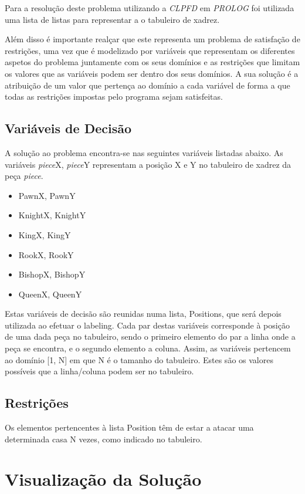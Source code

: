 \documentclass[runningheads]{llncs}
\begin{document}
Para a resolução deste problema utilizando a \emph{CLPFD} em \emph{PROLOG} foi utilizada uma lista de listas para representar a
o tabuleiro de xadrez.

Além disso é importante realçar que este representa um problema de satisfação de restrições, uma vez que é modelizado por variáveis que
representam os diferentes aspetos do problema juntamente com os seus domínios e as restrições que limitam os valores que as variáveis 
podem ser dentro dos seus domínios. A sua solução é a atribuição de um valor que pertença ao domínio a cada variável de forma a que todas 
as restrições impostas pelo programa sejam satisfeitas.

\subsection{Variáveis de Decisão}
    A solução ao problema encontra-se nas seguintes variáveis listadas abaixo. As variáveis \emph{piece}X, \emph{piece}Y 
    representam a posição X e Y no tabuleiro de xadrez da peça \emph{piece}.
    
    \begin{itemize}
        \item PawnX, PawnY
        \item KnightX, KnightY
        \item KingX, KingY
        \item RookX, RookY
        \item BishopX, BishopY
        \item QueenX, QueenY
    \end{itemize}
    
    Estas variáveis de decisão são reunidas numa lista, Positions, que será depois utilizada ao efetuar o labeling.
    Cada par destas variáveis corresponde à posição de uma dada peça no tabuleiro, sendo o primeiro elemento do par a linha onde a peça se encontra, e o segundo elemento a coluna.
    Assim, as variáveis pertencem ao domínio [1, N] em que N é o tamanho do tabuleiro. Estes são os valores possíveis que a linha/coluna podem ser no tabuleiro.
    
\subsection{Restrições}
    Os elementos pertencentes à lista Position têm de estar a atacar uma determinada casa N vezes, como indicado no tabuleiro.

\section{Visualização da Solução}
\end{document}
